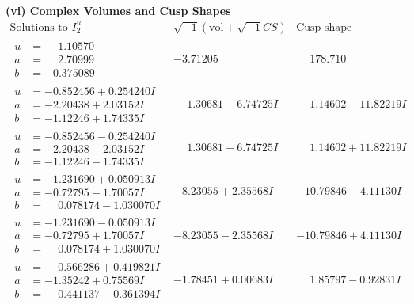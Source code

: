 \documentclass[1p]{elsarticle_modified}
\theoremstyle{definition}
\newcommand{\I}{\sqrt{-1}}
\begin{document}
\newpage\flushleft \textbf{(vi) Complex Volumes and Cusp Shapes}
$$\begin{array}{c|c|c}  
\text{Solutions to }I^u_{2}& \I (\text{vol} + \sqrt{-1}CS) & \text{Cusp shape}\\
 \hline 
\begin{aligned}
u &= \phantom{-}1.10570\phantom{ +0.000000I} \\
a &= \phantom{-}2.70999\phantom{ +0.000000I} \\
b &= -0.375089\phantom{ +0.000000I}\end{aligned}
 & -3.71205\phantom{ +0.000000I} & \phantom{-}178.710\phantom{ +0.000000I} \\ \hline\begin{aligned}
u &= -0.852456 + 0.254240 I \\
a &= -2.20438 + 2.03152 I \\
b &= -1.12246 + 1.74335 I\end{aligned}
 & \phantom{-}1.30681 + 6.74725 I & \phantom{-}1.14602 - 11.82219 I \\ \hline\begin{aligned}
u &= -0.852456 - 0.254240 I \\
a &= -2.20438 - 2.03152 I \\
b &= -1.12246 - 1.74335 I\end{aligned}
 & \phantom{-}1.30681 - 6.74725 I & \phantom{-}1.14602 + 11.82219 I \\ \hline\begin{aligned}
u &= -1.231690 + 0.050913 I \\
a &= -0.72795 - 1.70057 I \\
b &= \phantom{-}0.078174 - 1.030070 I\end{aligned}
 & -8.23055 + 2.35568 I & -10.79846 - 4.11130 I \\ \hline\begin{aligned}
u &= -1.231690 - 0.050913 I \\
a &= -0.72795 + 1.70057 I \\
b &= \phantom{-}0.078174 + 1.030070 I\end{aligned}
 & -8.23055 - 2.35568 I & -10.79846 + 4.11130 I \\ \hline\begin{aligned}
u &= \phantom{-}0.566286 + 0.419821 I \\
a &= -1.35242 + 0.75569 I \\
b &= \phantom{-}0.441137 - 0.361394 I\end{aligned}
 & -1.78451 + 0.00683 I & \phantom{-}1.85797 - 0.92831 I \\ \hline\begin{aligned}

\end{aligned}
\end{array}$$
\end{document}
